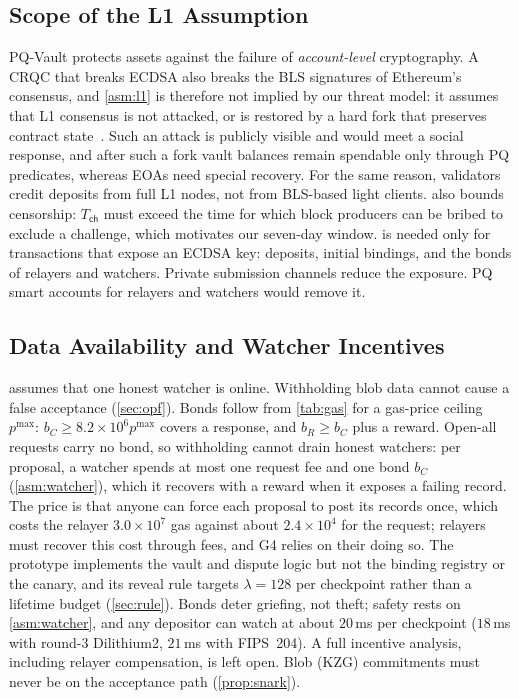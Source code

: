 \documentclass[10pt,journal,compsoc]{IEEEtran}
\theoremstyle{tplain}
\theoremstyle{tdef}
\theoremstyle{remark}
\begin{document}
\subsection{Scope of the L1 Assumption}\label{S-disc-l1}
PQ-Vault protects assets against the failure of \emph{account-level} cryptography. A CRQC that breaks ECDSA also breaks the BLS signatures of Ethereum's consensus, and \cref{asm:l1} is therefore not implied by our threat model: it assumes that L1 consensus is not attacked, or is restored by a hard fork that preserves contract state~\cite{buterin2024emergency}. Such an attack is publicly visible and would meet a social response, and after such a fork vault balances remain spendable only through PQ predicates, whereas EOAs need special recovery. For the same reason, validators credit deposits from full L1 nodes, not from BLS-based light clients.  also bounds censorship: $T_{\mathsf{ch}}$ must exceed the time for which block producers can be bribed to exclude a challenge, which motivates our seven-day window.  is needed only for transactions that expose an ECDSA key: deposits, initial bindings, and the bonds of relayers and watchers. Private submission channels reduce the exposure. PQ smart accounts for relayers and watchers would remove it.

\subsection{Data Availability and Watcher Incentives}\label{S-disc-da}
 assumes that one honest watcher is online. Withholding blob data cannot cause a false acceptance (\cref{sec:opf}). Bonds follow from \cref{tab:gas} for a gas-price ceiling $p^{\max}$: $b_C\ge 8.2\times10^{6}p^{\max}$ covers a response, and $b_R\ge b_C$ plus a reward. Open-all requests carry no bond, so withholding cannot drain honest watchers: per proposal, a watcher spends at most one request fee and one bond $b_C$ (\cref{asm:watcher}), which it recovers with a reward when it exposes a failing record. The price is that anyone can force each proposal to post its records once, which costs the relayer $3.0\times10^{7}$ gas against about $2.4\times10^{4}$ for the request; relayers must recover this cost through fees, and G4 relies on their doing so. The prototype implements the vault and dispute logic but not the binding registry or the canary, and its reveal rule targets $\lambda=128$ per checkpoint rather than a lifetime budget (\cref{sec:rule}). Bonds deter griefing, not theft; safety rests on \cref{asm:watcher}, and any depositor can watch at about $20$\,ms per checkpoint ($18$\,ms with round-3 Dilithium2, $21$\,ms with FIPS~204). A full incentive analysis, including relayer compensation, is left open. Blob (KZG) commitments must never be on the acceptance path (\cref{prop:snark}).
\end{document}

